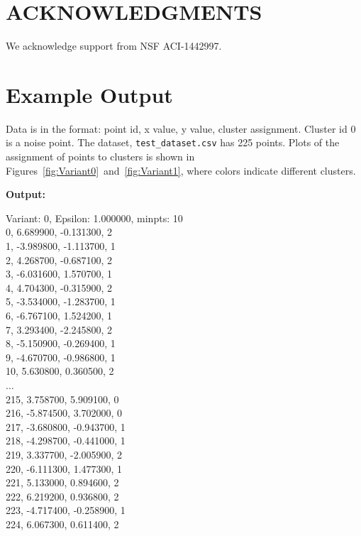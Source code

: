 \documentclass[12pt]{article}
\begin{document}
\section*{ACKNOWLEDGMENTS}
We acknowledge support from NSF ACI-1442997.



\appendix
\section{Example Output}\label{ex_output}

Data is in the format: point id, x value, y value, cluster assignment. Cluster id 0 is a noise point. The dataset, \verb|test_dataset.csv| has 225 points. Plots of the assignment of points to clusters is shown in Figures~\ref{fig:Variant0}~and~\ref{fig:Variant1}, where colors indicate different clusters.

\noindent\textbf{Output:} 

\noindent Variant: 0, Epsilon: 1.000000, minpts: 10
\\0, 6.689900, -0.131300, 2
\\1, -3.989800, -1.113700, 1
\\2, 4.268700, -0.687100, 2
\\3, -6.031600, 1.570700, 1
\\4, 4.704300, -0.315900, 2
\\5, -3.534000, -1.283700, 1
\\6, -6.767100, 1.524200, 1
\\7, 3.293400, -2.245800, 2
\\8, -5.150900, -0.269400, 1
\\9, -4.670700, -0.986800, 1
\\10, 5.630800, 0.360500, 2
\\$\ldots$
\\215, 3.758700, 5.909100, 0
\\216, -5.874500, 3.702000, 0
\\217, -3.680800, -0.943700, 1
\\218, -4.298700, -0.441000, 1
\\219, 3.337700, -2.005900, 2
\\220, -6.111300, 1.477300, 1
\\221, 5.133000, 0.894600, 2
\\222, 6.219200, 0.936800, 2
\\223, -4.717400, -0.258900, 1
\\224, 6.067300, 0.611400, 2\\
\end{document}
